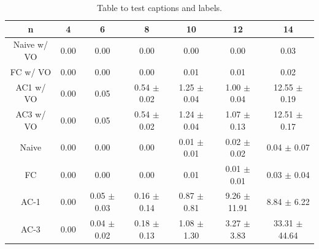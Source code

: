 \begin{table}[h!]
	\centering
	\begin{tabular}{|c|c|c|c|c|c|c|}
		\hline
		n           & 4    & 6               & 8               & 10              & 12               & 14                \\ \hline
		Naive w/ VO & 0.00 & 0.00            & 0.00            & 0.00            & 0.00             & 0.03              \\ \hline
		FC w/ VO    & 0.00 & 0.00            & 0.00            & 0.01            & 0.01             & 0.02              \\ \hline
		AC1 w/ VO   & 0.00 & 0.05            & 0.54 $\pm$ 0.02 & 1.25 $\pm$ 0.04 & 1.00 $\pm$ 0.04  & 12.55 $\pm$ 0.19  \\ \hline
		AC3 w/ VO   & 0.00 & 0.05            & 0.54 $\pm$ 0.02 & 1.24 $\pm$ 0.04 & 1.07 $\pm$ 0.13  & 12.51 $\pm$ 0.17  \\ \hline
		Naive       & 0.00 & 0.00            & 0.00            & 0.01 $\pm$ 0.01 & 0.02 $\pm$ 0.02  & 0.04 $\pm$ 0.07   \\ \hline
		FC          & 0.00 & 0.00            & 0.00            & 0.01            & 0.01 $\pm$ 0.01  & 0.03 $\pm$ 0.04   \\ \hline
		AC-1        & 0.00 & 0.05 $\pm$ 0.03 & 0.16 $\pm$ 0.14 & 0.87 $\pm$ 0.81 & 9.26 $\pm$ 11.91 & 8.84 $\pm$ 6.22   \\ \hline
		AC-3        & 0.00 & 0.04 $\pm$ 0.02 & 0.18 $\pm$ 0.13 & 1.08 $\pm$ 1.30 & 3.27 $\pm$ 3.83  & 33.31 $\pm$ 44.64 \\ \hline
	\end{tabular}
	\caption{Table to test captions and labels.}
	\label{tab:queens:time}
\end{table}

